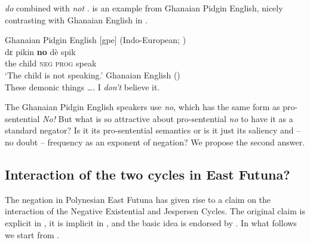 ﻿\documentclass[output=paper,draft,draftmode,colorlinks,citecolor=brown]{langscibook}
\begin{document}
\textit{do} combined with \textit{not} \parencite[140--141]{Auwera2017}.
 is an example from
Ghanaian Pidgin
English, nicely contrasting with Ghanaian English in
.
%
\begin{exe}
\ex\label{ex:int-ghanaianpidginenglish-child}
Ghanaian Pidgin English [gpe] (Indo-European;
\cites[140]{Auwera2017}[398]{Huber2012a})\\
    \gll dε  pikin  \textbf{no}  dè  spik \\
    the  child  \textsc{neg}  \textsc{prog}  speak \\
    \glt `The child is not speaking.'
    \ex\label{ex:int-ghanaianenglish-demonic}
Ghanaian English (\cites[140]{Auwera2017}[385]{Huber2012b})\\
    These demonic things …. I \textit{don't} believe it.
    \end{exe}
%
The Ghanaian Pidgin English speakers use \textit{no}, which has the same
form as pro-sentential \textit{No!} But what is so attractive about
pro-sentential \textit{no} to have it as a standard negator? Is it its
pro-sentential semantics or is it just its saliency and -- no doubt --
frequency as an exponent of negation? We propose the second answer.

\subsection{Interaction of the two cycles in East
Futuna?}\label{sec:int-4.2}

The negation in Polynesian East Futuna has given rise to a
claim on the interaction of the Negative Existential and Jespersen Cycles.
The original claim is explicit in \textcite[18]{Mosel1999}, it is implicit in
\textcite[122]{MoyseFaurie1999}, and the basic idea is endorsed by
\textcite[1359--1364]{Veselinova2014}. In what follows we start from
\textcite{Veselinova2014}.
\end{document}
